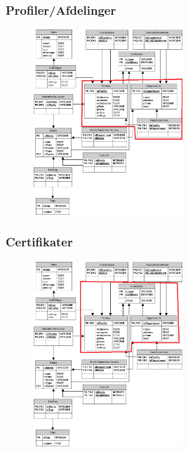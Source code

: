 \documentclass{beamer}
\begin{document}
\begin{frame}
	\frametitle{Profiler/Afdelinger}
	
	\begin{figure}[!h]
		\centering
			\includegraphics[width=0.5\textwidth]{dbProfil-Afdeling}
		\label{fig:ProfilerAfdelinger}
	\end{figure}
\end{frame}

\begin{frame}
	\frametitle{Certifikater}
	
	\begin{figure}[!h]
		\centering
			\includegraphics[width=0.5\textwidth]{dbCertificate}
		\label{fig:Certifikater}
	\end{figure}
\end{frame}
\end{document}
